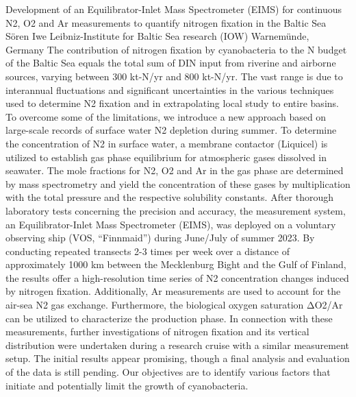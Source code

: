 \begin{conf-abstract}
{Development of an Equilibrator-Inlet Mass Spectrometer (EIMS) for continuous N2, O2 and Ar measurements to quantify nitrogen fixation in the Baltic Sea}
{Sören Iwe}
{Leibniz-Institute for Baltic Sea research (IOW) Warnemünde, Germany}
{The contribution of nitrogen fixation by cyanobacteria to the N budget of the Baltic Sea equals the total sum of DIN input from riverine and airborne sources, varying between 300 kt-N/yr and 800 kt-N/yr. The vast range is due to interannual fluctuations and significant uncertainties in the various techniques used to determine N2 fixation and in extrapolating local study to entire basins. To overcome some of the limitations, we introduce a new approach based on large-scale records of surface water N2 depletion during summer. 
To determine the concentration of N2 in surface water, a membrane contactor (Liquicel) is utilized to establish gas phase equilibrium for atmospheric gases dissolved in seawater. The mole fractions for N2, O2 and Ar in the gas phase are determined by mass spectrometry and yield the concentration of these gases by multiplication with the total pressure and the respective solubility constants. 
After thorough laboratory tests concerning the precision and accuracy, the measurement system, an Equilibrator-Inlet Mass Spectrometer (EIMS), was deployed on a voluntary observing ship (VOS, “Finnmaid”) during June/July of summer 2023. By conducting repeated transects 2-3 times per week over a distance of approximately 1000 km between the Mecklenburg Bight and the Gulf of Finland, the results offer a high-resolution time series of N2 concentration changes induced by nitrogen fixation. Additionally, Ar measurements are used to account for the air-sea N2 gas exchange. Furthermore, the biological oxygen saturation ΔO2/Ar can be utilized to characterize the production phase. 
In connection with these measurements, further investigations of nitrogen fixation and its vertical distribution were undertaken during a research cruise with a similar measurement setup.
The initial results appear promising, though a final analysis and evaluation of the data is still pending. Our objectives are to identify various factors that initiate and potentially limit the growth of cyanobacteria.}
\end{conf-abstract}
